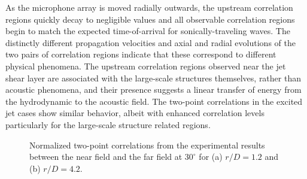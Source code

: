 \documentclass[english]{aiaa-tc}
\begin{document}
As the microphone array is moved radially outwards, the upstream correlation regions quickly decay to negligible values and all observable correlation regions begin to match the expected time-of-arrival for sonically-traveling waves. 
The distinctly different propagation velocities and axial and radial evolutions of the two pairs of correlation regions indicate that these correspond to different physical phenomena.
The upstream correlation regions observed near the jet shear layer are associated with the large-scale structures themselves, rather than acoustic phenomena, and their presence suggests a linear transfer of energy from the hydrodynamic to the acoustic field. 
The two-point correlations in the excited jet cases show similar behavior, albeit with enhanced correlation levels particularly for the large-scale structure related regions. 
\begin{figure}
	\begin{centering}
	\end{centering}
	\caption{Normalized two-point correlations from the experimental results between the near field and the far field at $30^\circ$ for (a) $r/D = 1.2$ and (b) $r/D = 4.2$.}
	\label{fig:exp_fullxcorr}
\end{figure}
\end{document}
